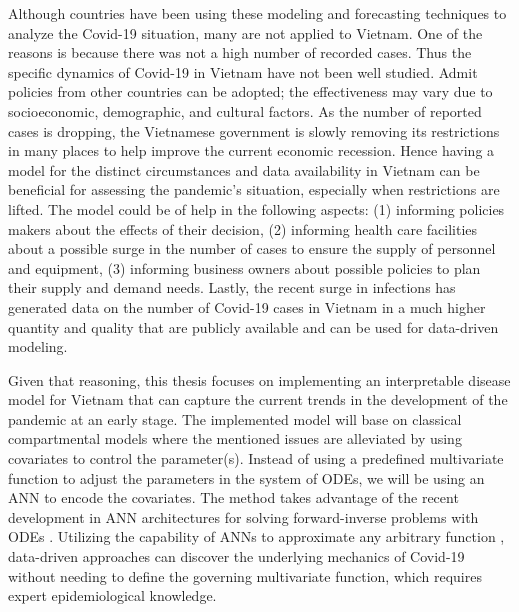 Although countries have been using these modeling and forecasting techniques to analyze the Covid-19 situation, many are not applied to Vietnam.
One of the reasons is because there was not a high number of recorded cases.
Thus the specific dynamics of Covid-19 in Vietnam have not been well studied.
Admit policies from other countries can be adopted; the effectiveness may vary due to socioeconomic, demographic, and cultural factors.
As the number of reported cases is dropping, the Vietnamese government is slowly removing its restrictions in many places to help improve the current economic recession.
Hence having a model for the distinct circumstances and data availability in Vietnam can be beneficial for assessing the pandemic's situation, especially when restrictions are lifted.
The model could be of help in the following aspects: (1) informing policies makers about the effects of their decision, (2) informing health care facilities about a possible surge in the number of cases to ensure the supply of personnel and equipment, (3) informing business owners about possible policies to plan their supply and demand needs.
Lastly, the recent surge in infections has generated data on the number of Covid-19 cases in Vietnam in a much higher quantity and quality that are publicly available and can be used for data-driven modeling.

Given that reasoning, this thesis focuses on implementing an interpretable disease model for Vietnam that can capture the current trends in the development of the pandemic at an early stage.
The implemented model will base on classical compartmental models where the mentioned issues are alleviated by using covariates to control the parameter(s).
Instead of using a predefined multivariate function to adjust the parameters in the system of \glspl{ODE}, we will be using an \gls{ANN} to encode the covariates.
The method takes advantage of the recent development in \gls{ANN} architectures for solving forward-inverse problems with \glspl{ODE} \cite{chenNeuralOrdinaryDifferential2019, rackauckasUniversalDifferentialEquations2020}.
Utilizing the capability of \glspl{ANN} to approximate any arbitrary function \cite{cybenkotApproximationSuperpositionsSigmoidal, hornikApproximationCapabilitiesMultilayer1991, hornikMultilayerFeedforwardNetworks1989}, data-driven approaches can discover the underlying mechanics of Covid-19 without needing to define the governing multivariate function, which requires expert epidemiological knowledge.

